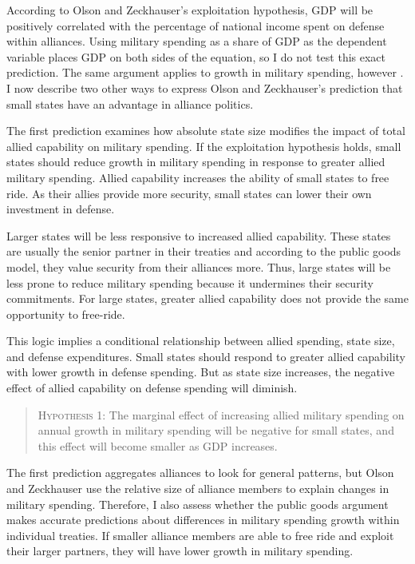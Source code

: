 \documentclass[12pt]{article}
\begin{document}
According to Olson and Zeckhauser's exploitation hypothesis, GDP will be positively correlated with the percentage of national income spent on defense within alliances.
Using military spending as a share of GDP as the dependent variable places GDP on both sides of the equation, so I do not test this exact prediction. 
The same argument applies to growth in military spending, however \citep{PluemperNeumayer2015}. 
I now describe two other ways to express Olson and Zeckhauser's prediction that small states have an advantage in alliance politics. 


The first prediction examines how absolute state size modifies the impact of total allied capability on military spending. 
If the exploitation hypothesis holds, small states should reduce growth in military spending in response to greater allied military spending.  
Allied capability increases the ability of small states to free ride. 
As their allies provide more security, small states can lower their own investment in defense. 

 
Larger states will be less responsive to increased allied capability. 
These states are usually the senior partner in their treaties and according to the public goods model, they value security from their alliances more. 
Thus, large states will be less prone to reduce military spending because it undermines their security commitments. 
For large states, greater allied capability does not provide the same opportunity to free-ride.


This logic implies a conditional relationship between allied spending, state size, and defense expenditures. 
Small states should respond to greater allied capability with lower growth in defense spending. 
But as state size increases, the negative effect of allied capability on defense spending will diminish. 


\begin{quote}
\textsc{Hypothesis 1}: The marginal effect of increasing allied military spending on annual growth in military spending will be negative for small states, and this effect will become smaller as GDP increases. 
\end{quote}


The first prediction aggregates alliances to look for general patterns, but Olson and Zeckhauser use the relative size of alliance members to explain changes in military spending. 
Therefore, I also assess whether the public goods argument makes accurate predictions about differences in military spending growth within individual treaties. 
If smaller alliance members are able to free ride and exploit their larger partners, they will have lower growth in military spending.  
\end{document}
